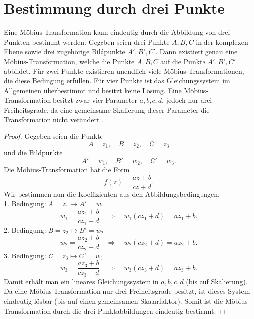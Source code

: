 %
%
%
%
\section{Bestimmung durch drei Punkte
\label{moebius:section:teil4}}


Eine Möbius-Transformation kann eindeutig durch die Abbildung von drei Punkten bestimmt werden.
Gegeben seien drei Punkte \( A, B, C \) in der komplexen Ebene sowie drei zugehörige Bildpunkte \( A', B', C' \). Dann existiert genau eine Möbius-Transformation, welche die Punkte \( A, B, C \) auf die Punkte \( A', B', C' \) abbildet.
Für zwei Punkte existieren unendlich viele Möbius-Transformationen, die diese Bedingung erfüllen. Für vier Punkte ist das Gleichungssystem im Allgemeinen überbestimmt und besitzt keine Lösung.
Eine Möbius-Transformation besitzt zwar vier Parameter \( a, b, c, d \), jedoch nur drei Freiheitsgrade, da eine gemeinsame Skalierung dieser Parameter die Transformation nicht verändert \cite{moebius:Moebiustransformationen}.
%

\begin{proof}
Gegeben seien die Punkte
\[
A = z_1, \quad B = z_2, \quad C = z_3
\]
und die Bildpunkte
\[
A' = w_1, \quad B' = w_2, \quad C' = w_3.
\]
Die Möbius-Transformation hat die Form
\[
f(z) = \frac{az + b}{cz + d}.
\]
Wir bestimmen nun die Koeffizienten aus den Abbildungsbedingungen.
\\
1. Bedingung: \( A = z_1 \mapsto A' = w_1 \)
\[
w_1 = \frac{a z_1 + b}{c z_1 + d}
\quad \Rightarrow \quad
w_1(c z_1 + d) = a z_1 + b.
\]
2. Bedingung: \( B = z_2 \mapsto B' = w_2 \)
\[
w_2 = \frac{a z_2 + b}{c z_2 + d}
\quad \Rightarrow \quad
w_2(c z_2 + d) = a z_2 + b.
\]
3. Bedingung: \( C = z_3 \mapsto C' = w_3 \)
\[
w_3 = \frac{a z_3 + b}{c z_3 + d}
\quad \Rightarrow \quad
w_3(c z_3 + d) = a z_3 + b.
\]
Damit erhält man ein lineares Gleichungssystem in \(a,b,c,d\) (bis auf Skalierung).
Da eine Möbius-Transformation nur drei Freiheitsgrade besitzt, ist dieses System eindeutig lösbar (bis auf einen gemeinsamen Skalarfaktor).
Somit ist die Möbius-Transformation durch die drei Punktabbildungen eindeutig bestimmt.
\end{proof}


